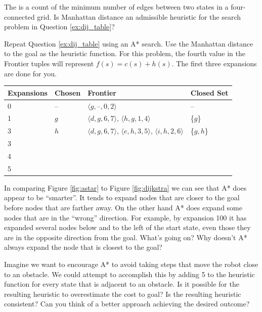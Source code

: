\begin{exercise}
  The  is a count of the minimum number of
  edges between two states in a four-connected grid.  Is Manhattan
  distance an admissible heuristic for the search problem in Question
  \ref{ex:dij_table}?
  \end{exercise}

\begin{exercise}
  Repeat Question \ref{ex:dij_table} using an A* search. Use the
  Manhattan distance to the goal as the heuristic function.  For this
  problem, the fourth value in the Frontier tuples will represent
  $f(s) = c(s) + h(s)$.  The first three expansions are done for you.

   \begin{center}
\begin{tabular}{|l|l|p{3in}|p{1in}|}
  \hline
  Expansions & Chosen  & Frontier & Closed Set \\
  \hline
  0 & -- & $\langle g, \text{--}, 0, 2 \rangle$& --\\
  \hline
  1&$g$& $\langle d, g , 6, 7\rangle$, $\langle h, g, 1, 4 \rangle$& \{$g$\}\\
  \hline
    3& $h$ & $\langle d, g, 6, 7 \rangle$,  $\langle e, h, 3, 5 \rangle$, $\langle i, h,2, 6 \rangle$  & \{$g, h$\} \\
    \hline
    3&&&\\
    \hline
    4&&&\\
    \hline
    5&&&\\
    \hline
\end{tabular}
\end{center}
  
  \end{exercise}

\begin{exercise}
In comparing Figure \ref{fig:astar} to Figure \ref{fig:dijkstra} we
can see that A* does appear to be ``smarter''. It tends to expand
nodes that are closer to the goal before nodes that are farther
away. On the other hand A* does expand some nodes that are in the
``wrong'' direction. For example, by expansion 100 it has expanded
several nodes below and to the left of the start state, even those
they are in the opposite direction from the goal.  What's going on?
Why doesn't A* always expand the node that is closest to the goal?
\end{exercise}

\begin{exercise}
Imagine we want to encourage A* to avoid taking steps that move the
robot close to an obstacle.  We could attempt to accomplish this by
adding 5 to the heuristic function for every state that is adjacent to
an obstacle.  Is it possible for the resulting heuristic to
overestimate the cost to goal?  Is the resulting heuristic consistent?
Can you think of a better approach achieving the desired outcome?
\end{exercise}


